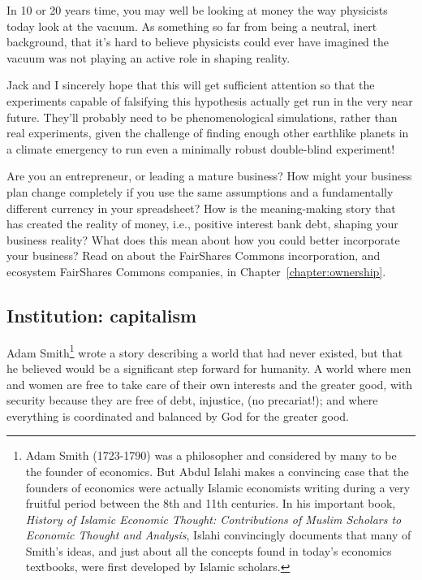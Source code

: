 In 10 or 20 years time, you may well be looking at money the way physicists today look at the vacuum. As something so far from being a neutral, inert background, that it's hard to believe physicists could ever have imagined the vacuum was not playing an active role in shaping reality.


Jack and I sincerely hope that this will get sufficient attention so that the experiments capable of falsifying this hypothesis actually get run in the very near future. They'll probably need to be phenomenological simulations, rather than real experiments, given the challenge of finding enough other earthlike planets in a climate emergency to run even a minimally robust double-blind experiment!


Are you an entrepreneur, or leading a mature business? How might your business plan change completely if you use the same assumptions and a fundamentally different currency in your spreadsheet? How is the meaning\hyp{}making story that has created the reality of money, i.e., positive interest bank debt, shaping your business reality? What does this mean about how you could better incorporate your business? Read on about the FairShares Commons incorporation, and ecosystem FairShares Commons companies, in Chapter~\ref{chapter:ownership}.




\subsection{Institution: capitalism}
Adam Smith\footnote{Adam Smith (1723-1790) was a philosopher and considered by many to be the founder of economics. But Abdul Islahi makes a convincing case that the founders of economics were actually Islamic economists writing during a very fruitful period between the 8th and 11th centuries\cite{islahi-history-islamic}. In his important book, \emph{History of Islamic Economic Thought: Contributions of Muslim Scholars to Economic Thought and Analysis}, Islahi convincingly documents that many of Smith’s ideas, and just about all the concepts found in today’s economics textbooks, were first developed by Islamic scholars. } wrote a story\cite{smith-wealth} describing a world that had never existed, but that he believed would be a significant step forward for humanity. A world where men and women are free to take care of their own interests and the greater good, with security because they are free of debt, injustice, (no precariat!); and where everything is coordinated and balanced by God for the greater good\cite{graeber-debt}. 


